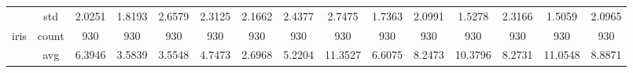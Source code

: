 \begin{table}[H]
{\begin{tabular}{rcccc|c|c|c|c|c|ccccc}
			                                                                               & std                                    & 2.0251                                                                             & 1.8193                                                                    & 2.6579                                                                    & 2.3125                                         & 2.1662                                                                    & 2.4377                                       & 2.7475                                      & 1.7363                                         & 2.0991                                         & 1.5278                                          & 2.3166                                          & 1.5059                                         & 2.0965                                         \\
			iris                                                                           & count                                  & 930                                                                                & 930                                                                       & 930                                                                       & 930                                            & 930                                                                       & 930                                          & 930                                         & 930                                            & 930                                            & 930                                             & 930                                             & 930                                            & 930                                            \\
			                                                                               & avg                                    & 6.3946                                                                             & 3.5839                                                                    & 3.5548                                                                    & 4.7473                                         & \cellcolor[rgb]{ .776,  .937,  .808}\textcolor[rgb]{ 0,  .38,  0}{2.6968} & 5.2204                                       & 11.3527                                     & 6.6075                                         & 8.2473                                         & 10.3796                                         & 8.2731                                          & 11.0548                                        & 8.8871                                         \\

\end{tabular}}
\end{table}
